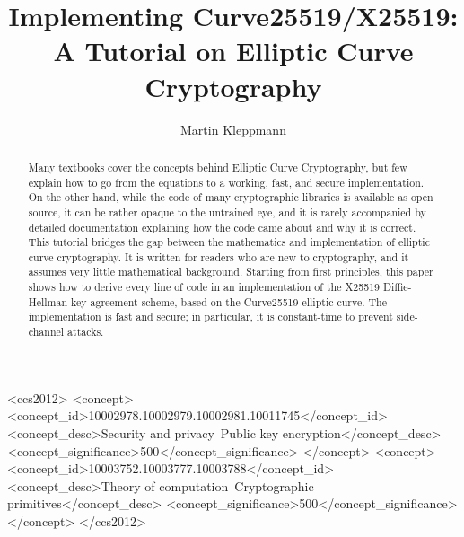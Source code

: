 \documentclass[manuscript]{acmart}
\begin{document}
\def\listingautorefname{Listing}%
\def\sectionautorefname{Section}%
\def\subsectionautorefname{Section}%
\def\subsubsectionautorefname{Section}%

\title{Implementing Curve25519/X25519: A Tutorial on Elliptic Curve Cryptography}

\author{Martin Kleppmann}

\begin{abstract}
Many textbooks cover the concepts behind Elliptic Curve Cryptography, but few explain how to go from the equations to a working, fast, and secure implementation.
On the other hand, while the code of many cryptographic libraries is available as open source, it can be rather opaque to the untrained eye, and it is rarely accompanied by detailed documentation explaining how the code came about and why it is correct.
This tutorial bridges the gap between the mathematics and implementation of elliptic curve cryptography.
It is written for readers who are new to cryptography, and it assumes very little mathematical background.
Starting from first principles, this paper shows how to derive every line of code in an implementation of the X25519 Diffie-Hellman key agreement scheme, based on the Curve25519 elliptic curve.
The implementation is fast and secure; in particular, it is constant-time to prevent side-channel attacks.
\end{abstract}

\begin{CCSXML}
<ccs2012>
   <concept>
       <concept_id>10002978.10002979.10002981.10011745</concept_id>
       <concept_desc>Security and privacy~Public key encryption</concept_desc>
       <concept_significance>500</concept_significance>
       </concept>
   <concept>
       <concept_id>10003752.10003777.10003788</concept_id>
       <concept_desc>Theory of computation~Cryptographic primitives</concept_desc>
       <concept_significance>500</concept_significance>
       </concept>
 </ccs2012>
\end{CCSXML}


\maketitle
\end{document}

